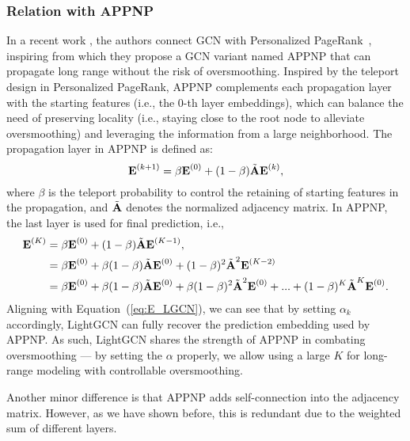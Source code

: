 \documentclass[sigconf]{acmart}
\theoremstyle{definition}
\begin{document}
\subsubsection{Relation with APPNP}\label{ss:APPNP} In a recent work \cite{ICLR19-APPNP}, the authors
connect GCN with Personalized PageRank~\cite{haveliwala2002topic}, inspiring from which they propose a GCN variant named APPNP that can propagate long range without the risk of oversmoothing. 
Inspired by the teleport design in Personalized PageRank, APPNP complements each propagation layer with the starting features (i.e., the 0-th layer embeddings), which can balance the need of preserving locality (i.e., staying close to the root node to alleviate oversmoothing) and leveraging the information from a large neighborhood. The propagation layer in APPNP is defined as:
\begin{equation}
    \textbf{E}^{(k+1)} = \beta \textbf{E}^{(0)} + (1-\beta) \Tilde{\textbf{A}} \textbf{E}^{(k)},
\end{equation}
where $\beta$ is the teleport probability to control the retaining of starting features in the propagation, and $\Tilde{\textbf{A}}$ denotes the normalized adjacency matrix. In APPNP, the last layer is used for final prediction, i.e., 
\begin{equation}
\begin{aligned}
    \textbf{E}^{(K)} &= \beta \textbf{E}^{(0)} + (1-\beta) \Tilde{\textbf{A}} \textbf{E}^{(K-1)}, \\
    &= \beta \textbf{E}^{(0)} + \beta (1-\beta) \Tilde{\textbf{A}} \textbf{E}^{(0)} + (1-\beta)^2 \Tilde{\textbf{A}}^2 \textbf{E}^{(K-2)} \\
    &= \beta \textbf{E}^{(0)} + \beta (1-\beta) \Tilde{\textbf{A}} \textbf{E}^{(0)} + \beta(1-\beta)^2 \Tilde{\textbf{A}}^2 \textbf{E}^{(0)} + ... + (1-\beta)^K \Tilde{\textbf{A}}^K \textbf{E}^{(0)}.
\end{aligned}
\end{equation}
Aligning with Equation~(\ref{eq:E_LGCN}), we can see that by setting $\alpha_k$ accordingly, LightGCN can fully recover the prediction embedding used by APPNP. 
As such, LightGCN shares the strength of APPNP in combating oversmoothing --- by setting the $\alpha$ properly, we allow using a large $K$ for long-range modeling with controllable oversmoothing. 

Another minor difference is that APPNP adds self-connection into the adjacency matrix. However, as we have shown before, this is redundant due to the weighted sum of different layers. 
\end{document}
